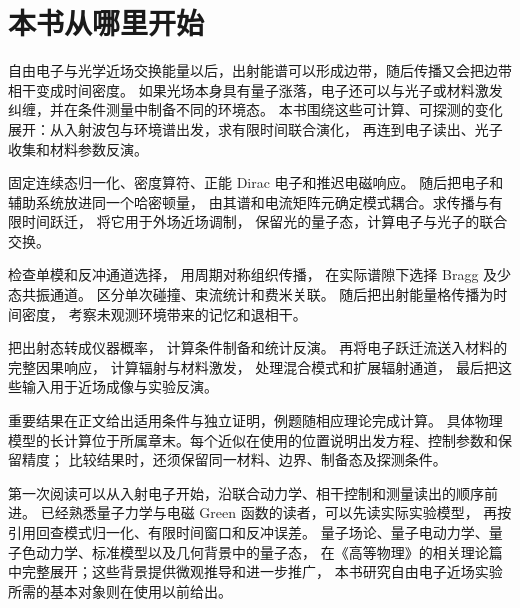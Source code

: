 \chapter*{本书从哪里开始}

自由电子与光学近场交换能量以后，出射能谱可以形成边带，随后传播又会把边带相干变成时间密度。
如果光场本身具有量子涨落，电子还可以与光子或材料激发纠缠，并在条件测量中制备不同的环境态。
本书围绕这些可计算、可探测的变化展开：从入射波包与环境谱出发，求有限时间联合演化，
再连到电子读出、光子收集和材料参数反演。

固定连续态归一化、密度算符、正能 Dirac 电子和推迟电磁响应。
随后把电子和辅助系统放进同一个哈密顿量，
由其谱和电流矩阵元确定模式耦合。求传播与有限时间跃迁，
将它用于外场近场调制，
保留光的量子态，计算电子与光子的联合交换。

检查单模和反冲通道选择，
用周期对称组织传播，
在实际谱隙下选择 Bragg 及少态共振通道。
区分单次碰撞、束流统计和费米关联。
随后把出射能量格传播为时间密度，
考察未观测环境带来的记忆和退相干。

把出射态转成仪器概率，
计算条件制备和统计反演。
再将电子跃迁流送入材料的完整因果响应，
计算辐射与材料激发，
处理混合模式和扩展辐射通道，
最后把这些输入用于近场成像与实验反演。

重要结果在正文给出适用条件与独立证明，例题随相应理论完成计算。
具体物理模型的长计算位于所属章末。每个近似在使用的位置说明出发方程、控制参数和保留精度；
比较结果时，还须保留同一材料、边界、制备态及探测条件。

第一次阅读可以从入射电子开始，沿联合动力学、相干控制和测量读出的顺序前进。
已经熟悉量子力学与电磁 Green 函数的读者，可以先读实际实验模型，
再按引用回查模式归一化、有限时间窗口和反冲误差。
量子场论、量子电动力学、量子色动力学、标准模型以及几何背景中的量子态，
在《高等物理》的相关理论篇中完整展开；这些背景提供微观推导和进一步推广，
本书研究自由电子近场实验所需的基本对象则在使用以前给出。
